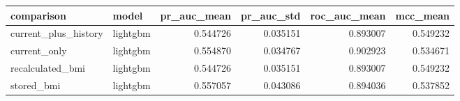 \begin{tabular}{llrrrr}
\toprule
comparison & model & pr\_auc\_mean & pr\_auc\_std & roc\_auc\_mean & mcc\_mean \\
\midrule
current\_plus\_history & lightgbm & 0.544726 & 0.035151 & 0.893007 & 0.549232 \\
current\_only & lightgbm & 0.554870 & 0.034767 & 0.902923 & 0.534671 \\
recalculated\_bmi & lightgbm & 0.544726 & 0.035151 & 0.893007 & 0.549232 \\
stored\_bmi & lightgbm & 0.557057 & 0.043086 & 0.894036 & 0.537852 \\
\bottomrule
\end{tabular}
